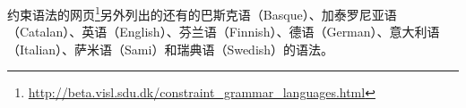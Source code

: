 \begin{itemize}
\end{itemize}
约束语法的网页\footnote{
  \url{http://beta.visl.sdu.dk/constraint_grammar_languages.html}
}另外列出的还有的巴斯克语（Basque）、加泰罗尼亚语（Catalan）、英语（English）、芬兰语（Finnish）、德语（German）、意大利语（Italian）、萨米语（Sami）和瑞典语（Swedish）的语法。
%
